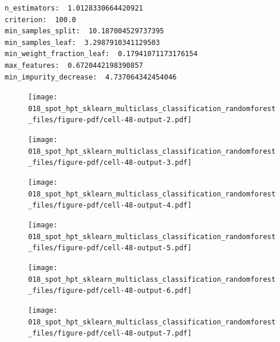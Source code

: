 \documentclass[
  letterpaper,
  DIV=11,
  numbers=noendperiod]{scrreprt}
\begin{document}
\begin{verbatim}
n_estimators:  1.0128330664420921
criterion:  100.0
min_samples_split:  10.187004529737395
min_samples_leaf:  3.2987910341129503
min_weight_fraction_leaf:  0.17941071173176154
max_features:  0.6720442198390857
min_impurity_decrease:  4.737064342454046
\end{verbatim}

\begin{figure}[H]

{\centering \texttt{[image: 018\_spot\_hpt\_sklearn\_multiclass\_classification\_randomforest\_files/figure-pdf/cell-48-output-2.pdf]}

}

\end{figure}

\begin{figure}[H]

{\centering \texttt{[image: 018\_spot\_hpt\_sklearn\_multiclass\_classification\_randomforest\_files/figure-pdf/cell-48-output-3.pdf]}

}

\end{figure}

\begin{figure}[H]

{\centering \texttt{[image: 018\_spot\_hpt\_sklearn\_multiclass\_classification\_randomforest\_files/figure-pdf/cell-48-output-4.pdf]}

}

\end{figure}

\begin{figure}[H]

{\centering \texttt{[image: 018\_spot\_hpt\_sklearn\_multiclass\_classification\_randomforest\_files/figure-pdf/cell-48-output-5.pdf]}

}

\end{figure}

\begin{figure}[H]

{\centering \texttt{[image: 018\_spot\_hpt\_sklearn\_multiclass\_classification\_randomforest\_files/figure-pdf/cell-48-output-6.pdf]}

}

\end{figure}

\begin{figure}[H]

{\centering \texttt{[image: 018\_spot\_hpt\_sklearn\_multiclass\_classification\_randomforest\_files/figure-pdf/cell-48-output-7.pdf]}

}

\end{figure}
\end{document}
